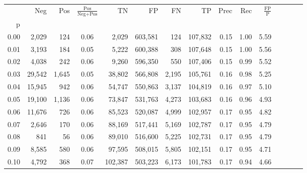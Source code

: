 \begin{tabular}{rrrcrrrrrrrrrrr}
\toprule
{} &     Neg &    Pos & $\frac{\text{Pos}}{\text{Neg}+\text{Pos}}$ &       TN &       FP &       FN &       TP &  Prec &   Rec & $\frac{\text{FP}}{\text{P}}$ \\
p    &         &        &                                            &          &          &          &          &       &       &                              \\
\midrule
0.00 &   2,029 &    124 &                                       0.06 &    2,029 &  603,581 &      124 &  107,832 &  0.15 &  1.00 &                         5.59 \\
0.01 &   3,193 &    184 &                                       0.05 &    5,222 &  600,388 &      308 &  107,648 &  0.15 &  1.00 &                         5.56 \\
0.02 &   4,038 &    242 &                                       0.06 &    9,260 &  596,350 &      550 &  107,406 &  0.15 &  0.99 &                         5.52 \\
0.03 &  29,542 &  1,645 &                                       0.05 &   38,802 &  566,808 &    2,195 &  105,761 &  0.16 &  0.98 &                         5.25 \\
0.04 &  15,945 &    942 &                                       0.06 &   54,747 &  550,863 &    3,137 &  104,819 &  0.16 &  0.97 &                         5.10 \\
0.05 &  19,100 &  1,136 &                                       0.06 &   73,847 &  531,763 &    4,273 &  103,683 &  0.16 &  0.96 &                         4.93 \\
0.06 &  11,676 &    726 &                                       0.06 &   85,523 &  520,087 &    4,999 &  102,957 &  0.17 &  0.95 &                         4.82 \\
0.07 &   2,646 &    170 &                                       0.06 &   88,169 &  517,441 &    5,169 &  102,787 &  0.17 &  0.95 &                         4.79 \\
0.08 &     841 &     56 &                                       0.06 &   89,010 &  516,600 &    5,225 &  102,731 &  0.17 &  0.95 &                         4.79 \\
0.09 &   8,585 &    580 &                                       0.06 &   97,595 &  508,015 &    5,805 &  102,151 &  0.17 &  0.95 &                         4.71 \\
0.10 &   4,792 &    368 &                                       0.07 &  102,387 &  503,223 &    6,173 &  101,783 &  0.17 &  0.94 &                         4.66 \\

\end{tabular}
